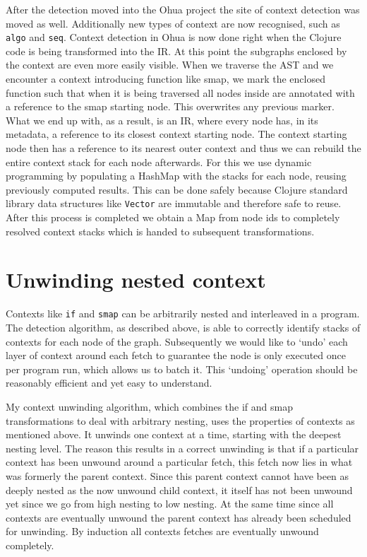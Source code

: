 After the detection moved into the Ohua project the site of context detection was moved as well.
Additionally new types of context are now recognised, such as \texttt{algo} and \texttt{seq}.
Context detection in Ohua is now done right when the Clojure code is being transformed into the IR.
At this point the subgraphs enclosed by the context are even more easily visible.
When we traverse the AST and we encounter a context introducing function like smap, we mark the enclosed function such that when it is being traversed all nodes inside are annotated with a reference to the smap starting node.
This overwrites any previous marker.
What we end up with, as a result, is an IR, where every node has, in its metadata, a reference to its closest context starting node.
The context starting node then has a reference to its nearest outer context and thus we can rebuild the entire context stack for each node afterwards.
For this we use dynamic programming by populating a HashMap with the stacks for each node, reusing previously computed results.
This can be done safely because Clojure standard library data structures like \texttt{Vector} are immutable and therefore safe to reuse.
After this process is completed we obtain a Map from node ids to completely resolved context stacks which is handed to subsequent transformations.

\section{Unwinding nested context}

Contexts like \texttt{if} and \texttt{smap} can be arbitrarily nested and interleaved in a program.
The detection algorithm, as described above, is able to correctly identify stacks of contexts for each node of the graph.
Subsequently we would like to `undo' each layer of context around each fetch to guarantee the node is only executed once per program run, which allows us to batch it.
This `undoing' operation should be reasonably efficient and yet easy to understand.

My context unwinding algorithm, which combines the if and smap transformations to deal with arbitrary nesting, uses the properties of contexts as mentioned above.
It unwinds one context at a time, starting with the deepest nesting level.
The reason this results in a correct unwinding is that if a particular context has been unwound around a particular fetch, this fetch now lies in what was formerly the parent context.
Since this parent context cannot have been as deeply nested as the now unwound child context, it itself has not been unwound yet since we go from high nesting to low nesting.
At the same time since all contexts are eventually unwound the parent context has already been scheduled for unwinding.
By induction all contexts fetches are eventually unwound completely.

